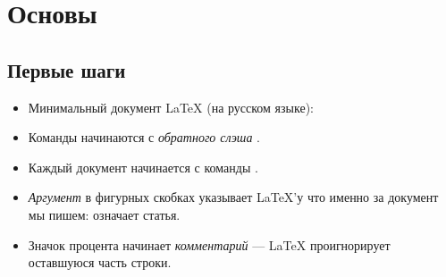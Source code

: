 \documentclass{beamer}
\begin{document}
\section{Основы}

\subsection{Первые шаги}
\begin{frame}[fragile]{\insertsubsection}
\begin{itemize}
  \item Минимальный документ \LaTeX{} (на русском языке):

\item Команды начинаются с \emph{обратного слэша} \keystrokebftt{\bs}.
\item Каждый документ начинается с команды .
\item \emph{Аргумент} в фигурных скобках \keystrokebftt{\{} \keystrokebftt{\}}
  указывает \LaTeX'у что именно за документ мы пишем:  означает статья.
\item Значок процента \keystrokebftt{\%} начинает \emph{комментарий} --- \LaTeX{}
проигнорирует оставшуюся часть строки.
\end{itemize}
\end{frame}
\end{document}
